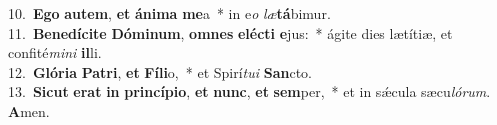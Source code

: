 {10.~}\textbf{E}\textbf{go} \textbf{au}\textbf{tem}, \textbf{et} \textbf{á}\textbf{ni}\textbf{ma} \textbf{me}a~* in e\textit{o} \textit{læ}\textbf{tá}bimur.\\
{11.~}\textbf{Be}\textbf{ne}\textbf{dí}\textbf{ci}\textbf{te} \textbf{Dó}\textbf{mi}\textbf{num}, \textbf{om}\textbf{nes} \textbf{e}\textbf{lé}\textbf{cti} \textbf{e}jus:~* ágite dies lætítiæ, et confité\textit{mi}\textit{ni} \textbf{il}li.\\
{12.~}\textbf{Gló}\textbf{ri}\textbf{a} \textbf{Pa}\textbf{tri}, \textbf{et} \textbf{Fí}\textbf{li}o,~* et Spirí\textit{tu}\textit{i} \textbf{San}cto.\\
{13.~}\textbf{Si}\textbf{cut} \textbf{e}\textbf{rat} \textbf{in} \textbf{prin}\textbf{cí}\textbf{pi}\textbf{o}, \textbf{et} \textbf{nunc}, \textbf{et} \textbf{sem}per,~* et in sǽcula sæcu\textit{ló}\textit{rum}. \textbf{A}men.\\
